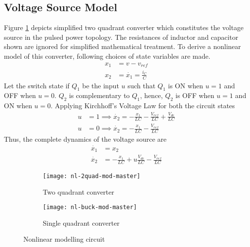 	\subsection{Voltage Source Model}
    Figure \ref{fig:nl-1} depicts simplified two quadrant converter which constitutes the voltage source in the pulsed power topology. The resistances of inductor and capacitor shown are ignored for simplified mathematical treatment. To derive a nonlinear model of this converter, following choices of state variables are made.
    \begin{align*}
    	x_1 &= v - v_{ref} \\
    	x_2 &= \dot{x_1} = \frac{i_C}{C}
    \end{align*}
    Let the switch state if $Q_1$ be the input $u$ such that $Q_1$ is ON when $u = 1$ and OFF when $u = 0$. $Q_2$ is complementary to $Q_1$, hence, $Q_2$ is OFF when $u = 1$ and ON when $u = 0$. Applying Kirchhoff's Voltage Law for both the circuit states
    \begin{align*}
        u &= 1 \implies \dot{x_2} = -\frac{x_1}{LC} -\frac{V_{ref}}{LC} + \frac{V_{dc}}{LC}\\
        u &= 0 \implies \dot{x_2} = -\frac{x_1}{LC} -\frac{V_{ref}}{LC}
    \end{align*}
    Thus, the complete dynamics of the voltage source are
    \begin{align}
        \dot{x_1} &= x_2\\
        \dot{x_2} &= -\frac{x_1}{LC} + u\frac{V_{dc}}{LC} -\frac{V_{ref}}{LC}
        \label{eq:nl1}
    \end{align}
	\begin{figure}[h]
		\begin{subfigure}{.55\textwidth}
          \centering
          \texttt{[image: nl-2quad-mod-master]}
          \caption{Two quadrant converter}
          \label{fig:nl-1}
        \end{subfigure}
        \begin{subfigure}{.4\textwidth}
          \vspace{2cm}
          \centering
          \texttt{[image: nl-buck-mod-master]}
          \caption{Single quadrant converter}
          \label{fig:nl-2}
        \end{subfigure}
		\caption{Nonlinear modelling circuit}
	\end{figure}

